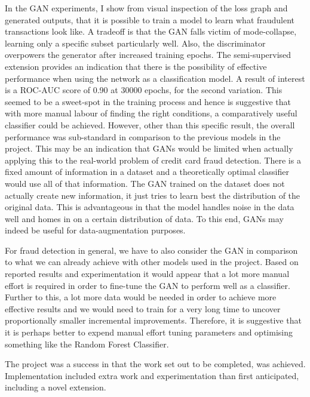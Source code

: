 \documentclass[12pt,a4paper,twoside]{report}
\begin{document}
In the GAN experiments, I show from visual inspection of the loss graph and generated outputs, that it is possible to train a model to learn what fraudulent transactions look like. A tradeoff is that the GAN falls victim of mode-collapse, learning only a specific subset particularly well. Also, the discriminator overpowers the generator after increased training epochs. The semi-supervised extension provides an  indication that there is the possibility of effective performance when using the network as a classification model. A result of interest is a ROC-AUC score of 0.90 at 30000 epochs, for the second variation. This seemed to be a sweet-spot in the training process and hence is suggestive that with more manual labour of finding the right conditions, a comparatively useful classifier could be achieved. However, other than this specific result, the overall performance was sub-standard in comparison to the previous models in the project. This may be an indication that GANs would be limited when actually applying this to the real-world problem of credit card fraud detection. There is a fixed amount of information in a dataset and a theoretically optimal classifier would use all of that information. The GAN trained on the dataset does not actually create new information, it just tries to learn best the distribution of the original data. This is advantageous in that the model handles noise in the data well and homes in on a certain distribution of data. To this end, GANs may indeed be useful for data-augmentation purposes. 

For fraud detection in general, we have to also consider the GAN in comparison to what we can already achieve with other models used in the project. Based on reported results and experimentation it would appear that a lot more manual effort is required in order to fine-tune the GAN to perform well as a classifier. Further to this, a lot more data would be needed in order to achieve more effective results and we would need to train for a very long time to uncover proportionally smaller incremental improvements. Therefore, it is suggestive that it is perhaps better to expend manual effort tuning parameters and optimising something like the Random Forest Classifier. 

The project was a success in that the work set out to be completed, was achieved. Implementation included extra work and experimentation than first anticipated, including a novel extension. 



\newpage
{}


\end{document}
